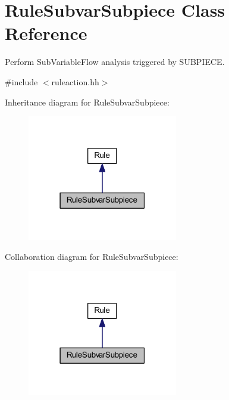 \hypertarget{class_rule_subvar_subpiece}{}\section{Rule\+Subvar\+Subpiece Class Reference}
\label{class_rule_subvar_subpiece}


Perform Sub\+Variable\+Flow analysis triggered by S\+U\+B\+P\+I\+E\+CE.  




{\ttfamily \#include $<$ruleaction.\+hh$>$}



Inheritance diagram for Rule\+Subvar\+Subpiece\+:
\nopagebreak
\begin{figure}[H]
\begin{center}
\leavevmode
\includegraphics[width=186pt]{class_rule_subvar_subpiece__inherit__graph}
\end{center}
\end{figure}


Collaboration diagram for Rule\+Subvar\+Subpiece\+:
\nopagebreak
\begin{figure}[H]
\begin{center}
\leavevmode
\includegraphics[width=186pt]{class_rule_subvar_subpiece__coll__graph}
\end{center}
\end{figure}
